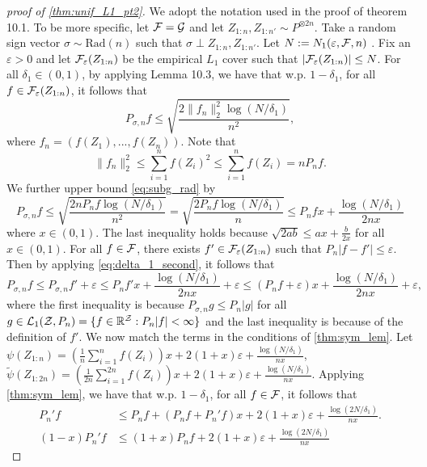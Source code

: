 \documentclass[twoside]{article}
\begin{document}
\begin{proof}[proof of \cref{thm:unif_L1_pt2}]
    We adopt the notation used in the proof of theorem 10.1. To be more specific, let $\mathcal{F}=\mathcal{G}$ and let $Z_{1:n},Z_{1:n'}\sim P^{\otimes 2n}$. Take a random sign vector $\sigma\sim\mathrm{Rad}(n)$ such that $\sigma \perp Z_{1:n},Z_{1:n'}$. Let $N:=N_1(\varepsilon,\mathcal{F},n)$ . Fix an $\varepsilon>0$ and let $\mathcal{F}_{\varepsilon}(Z_{1:n})$ be the empirical $L_1$ cover such that $|\mathcal{F}_{\varepsilon}(Z_{1:n})|\le N$. For all $\delta_1\in (0,1)$, by applying Lemma 10.3, we have that w.p. $1-\delta_1$, for all $f\in \mathcal{F}_{\varepsilon}(Z_{1:n})$, it follows that 
    \begin{equation}
        P_{\sigma,n}f\le \sqrt{\frac{2\|f_n\|_2^2\log(N/\delta_1)}{n^2}}\label{eq:subg_rad},
    \end{equation}
    where $f_n=(f(Z_1),...,f(Z_n))$. Note that 
    \begin{equation*}
        \|f_n\|_2^2\le \sum_{i=1}^n f(Z_i)^2\le \sum_{i=1}^n f(Z_i)=nP_nf.
    \end{equation*}
    We further upper bound \cref{eq:subg_rad} by
    \begin{equation}
        P_{\sigma,n}f\le \sqrt{\frac{2nP_nf\log(N/\delta_1)}{n^2}} = \sqrt{\frac{2P_nf\log(N/\delta_1)}{n}}\le P_nf x + \frac{\log(N/\delta_1)}{2nx}\label{eq:delta_1_second}
    \end{equation}
    where $x\in (0,1)$. The last inequality holds because $\sqrt{2ab}\le ax+\frac{b}{2x}$ for all $x\in(0,1)$.
    For all $f\in \mathcal{F}$, there exists $f'\in \mathcal{F}_{\varepsilon}(Z_{1:n})$ such that $P_n|f-f'|\le \varepsilon$. Then by applying \cref{eq:delta_1_second},
    it follows that
    \begin{equation*}
        P_{\sigma,n}f\le P_{\sigma ,n}f'+\varepsilon\le P_nf'x+\frac{\log(N/\delta_1)}{2nx}+\varepsilon\le (P_nf+\varepsilon)x+\frac{\log(N/\delta_1)}{2nx}+\varepsilon,
    \end{equation*}
    where the first inequality is because $P_{\sigma,n}g\le P_n|g|$ for all $g\in \mathcal{L}_1(\mathcal{Z}, P_n)=\{f\in \mathbb{R}^{\mathcal{Z}}:P_n|f|<\infty\}$ and the last inequality is because of the definition of $f'$. We now match the terms in the conditions of \cref{thm:sym_lem}. Let $\psi(Z_{1:n})=(\frac{1}{n}\sum_{i=1}^n f(Z_i))x+2(1+x)\varepsilon+\frac{\log(N/\delta_1)}{nx}$, $\tilde \psi(Z_{1:2n})=(\frac{1}{2n}\sum_{i=1}^{2n}f(Z_i))x+2(1+x)\varepsilon+\frac{\log(N/\delta_1)}{nx}$. Applying \cref{thm:sym_lem}, we have that w.p. $1-\delta_1$, for all $f\in \mathcal{F}$, it follows that
    \begin{align*}
        P_n'f&\le P_nf+(P_nf + P_n'f)x+2(1+x)\varepsilon+\frac{\log(2N/\delta_1)}{nx}.\\
        (1-x)P_n'f&\le (1+x)P_nf + 2(1+x)\varepsilon+\frac{\log(2N/\delta_1)}{nx}
    \end{align*}


\end{proof}
\end{document}
